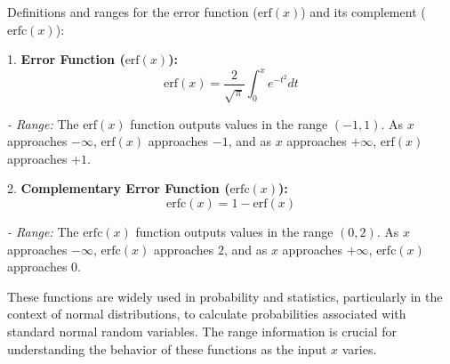 \documentclass[a4paper, 12pt]{article}
\title{}
\author{}
\begin{document}
\maketitle

Definitions and ranges for the error function (\( \text{erf}(x) \)) and its complement (\( \text{erfc}(x) \)):

1. {\bf Error Function (\( \text{erf}(x) \)):}
   \[ \text{erf}(x) = \frac{2}{\sqrt{\pi}} \int_{0}^{x} e^{-t^2} dt \]
   
   {\it- Range:} The \(\text{erf}(x)\) function outputs values in the range \((-1, 1)\). As \(x\) approaches \(-\infty\), \(\text{erf}(x)\) approaches \(-1\), and as \(x\) approaches \(+\infty\), \(\text{erf}(x)\) approaches \(+1\).

2. {\bf Complementary Error Function (\( \text{erfc}(x) \)):}
   \[ \text{erfc}(x) = 1 - \text{erf}(x) \]

   {\it- Range:} The \(\text{erfc}(x)\) function outputs values in the range \((0, 2)\). As \(x\) approaches \(-\infty\), \(\text{erfc}(x)\) approaches \(2\), and as \(x\) approaches \(+\infty\), \(\text{erfc}(x)\) approaches \(0\).

These functions are widely used in probability and statistics, particularly in the context of normal distributions, to calculate probabilities associated with standard normal random variables. The range information is crucial for understanding the behavior of these functions as the input \(x\) varies.










%
%
\end{document}
